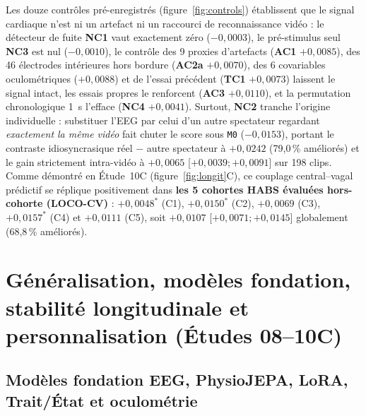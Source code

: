 \documentclass[10pt]{article}
\begin{document}
Les douze contrôles pré-enregistrés (figure~\ref{fig:controls}) établissent que le signal cardiaque n'est ni un artefact ni un raccourci de reconnaissance vidéo : le détecteur de fuite \textbf{NC1} vaut exactement zéro ($-0{,}0003$), le pré-stimulus seul \textbf{NC3} est nul ($-0{,}0010$), le contrôle des 9 proxies d'artefacts (\textbf{AC1} $+0{,}0085$), des 46 électrodes intérieures hors bordure (\textbf{AC2a} $+0{,}0070$), des 6 covariables oculométriques ($+0{,}0088$) et de l'essai précédent (\textbf{TC1} $+0{,}0073$) laissent le signal intact, les essais propres le renforcent (\textbf{AC3} $+0{,}0110$), et la permutation chronologique 1~s l'efface (\textbf{NC4} $+0{,}0041$). Surtout, \textbf{NC2} tranche l'origine individuelle : substituer l'EEG par celui d'un autre spectateur regardant \emph{exactement la même vidéo} fait chuter le score sous \texttt{M0} ($-0{,}0153$), portant le contraste idiosyncrasique réel $-$ autre spectateur à \textbf{$+0{,}0242$} (79,0\,\% améliorés) et le gain strictement intra-vidéo à \textbf{$+0{,}0065$} [$+0{,}0039 ; +0{,}0091$] sur 198 clips. Comme démontré en Étude~10C (figure~\ref{fig:longit}C), ce couplage central--vagal prédictif \cite{thayer2009} se réplique positivement dans \textbf{les 5 cohortes HABS évaluées hors-cohorte (LOCO-CV)} : $+0{,}0048^*$ (C1), $+0{,}0150^*$ (C2), $+0{,}0069$ (C3), $+0{,}0157^*$ (C4) et $+0{,}0111$ (C5), soit \textbf{$+0{,}0107$} [$+0{,}0071 ; +0{,}0145$] globalement (68,8\,\% améliorés).

\section{Généralisation, modèles fondation, stabilité longitudinale et personnalisation (Études 08--10C)}
\label{sec:gen}

\subsection{Modèles fondation EEG, PhysioJEPA, LoRA, Trait/État et oculométrie}
\end{document}
